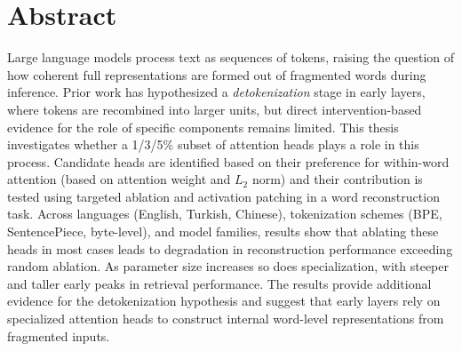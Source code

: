 \chapter*{Abstract}
\pagestyle{plain}

Large language models process text as sequences of tokens, raising the question of how coherent full representations are formed out of fragmented words during inference. Prior work has hypothesized a \textit{detokenization} stage in early layers, where tokens are recombined into larger units, but direct intervention-based evidence for the role of specific components remains limited. This thesis investigates whether a 1/3/5\% subset of attention heads plays a role in this process. Candidate heads are identified based on their preference for within-word attention (based on attention weight and $L_2$ norm) and their contribution is tested using targeted ablation and activation patching in a word reconstruction task. Across languages (English, Turkish, Chinese), tokenization schemes (BPE, SentencePiece, byte-level), and model families, results show that ablating these heads in most cases leads to degradation in reconstruction performance exceeding random ablation. As parameter size increases so does specialization, with steeper and taller early peaks in retrieval performance. The results provide additional evidence for the detokenization hypothesis and suggest that early layers rely on specialized attention heads to construct internal word-level representations from fragmented inputs.
